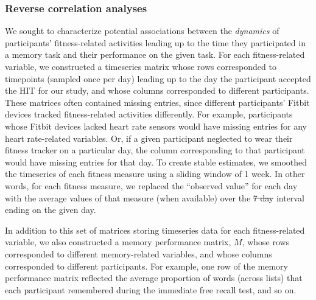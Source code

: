 \documentclass[10pt]{article}
\providecommand{\DIFaddtex}[1]{{\protect\color{blue}\uwave{#1}}} %
\providecommand{\DIFdeltex}[1]{{\protect\color{red}\sout{#1}}}                      %
\providecommand{\DIFaddbegin}{} %
\providecommand{\DIFaddend}{} %
\providecommand{\DIFdelbegin}{} %
\providecommand{\DIFdelend}{} %
\providecommand{\DIFadd}[1]{\texorpdfstring{\DIFaddtex{#1}}{#1}} %
\providecommand{\DIFdel}[1]{\texorpdfstring{\DIFdeltex{#1}}{}} %
\newcommand{\DIFscaledelfig}{0.5}
\newlength{\DIFdelgraphicswidth} %
\newlength{\DIFdelgraphicsheight} %
\newcommand{\DIFaddincludegraphics}[2][]{{\color{blue}\fbox{\DIFOincludegraphics[#1]{#2}}}} %
\newcommand{\DIFdelincludegraphics}[2][]{%
\sbox{\DIFdelgraphicsbox}{\DIFOincludegraphics[#1]{#2}}%
\settoboxwidth{\DIFdelgraphicswidth}{\DIFdelgraphicsbox} %
\settoboxtotalheight{\DIFdelgraphicsheight}{\DIFdelgraphicsbox} %
\scalebox{\DIFscaledelfig}{%
\parbox[b]{\DIFdelgraphicswidth}{\usebox{\DIFdelgraphicsbox}\\[-\baselineskip] \rule{\DIFdelgraphicswidth}{0em}}\llap{\resizebox{\DIFdelgraphicswidth}{\DIFdelgraphicsheight}{%
\setlength{\unitlength}{\DIFdelgraphicswidth}%
\begin{picture}(1,1)%
\thicklines\linethickness{2pt} %
{\color[rgb]{1,0,0}\put(0,0){\framebox(1,1){}}}%
{\color[rgb]{1,0,0}\put(0,0){\line( 1,1){1}}}%
{\color[rgb]{1,0,0}\put(0,1){\line(1,-1){1}}}%
\end{picture}%
}\hspace*{3pt}}} %
} %
\DeclareRobustCommand{\DIFaddbegin}{\DIFOaddbegin \let\includegraphics\DIFaddincludegraphics} %
\DeclareRobustCommand{\DIFaddend}{\DIFOaddend \let\includegraphics\DIFOincludegraphics} %
\DeclareRobustCommand{\DIFdelbegin}{\DIFOdelbegin \let\includegraphics\DIFdelincludegraphics} %
\DeclareRobustCommand{\DIFdelend}{\DIFOaddend \let\includegraphics\DIFOincludegraphics} %
\begin{document}
\subsubsection*{Reverse correlation analyses}
We sought to characterize potential associations between the \textit{dynamics}
of participants' fitness-related activities leading up to the time
they participated in a memory task and their performance on the given
task.  For each fitness-related variable, we constructed a timeseries
matrix whose rows corresponded to timepoints (sampled once per day)
leading up to the day the participant accepted the HIT for our study,
and whose columns corresponded to different participants.  These
matrices often contained missing entries, since different
participants' Fitbit devices tracked fitness-related activities
differently.  For example, participants whose Fitbit devices lacked
heart rate sensors would have missing entries for any heart
rate-related variables.  Or, if a given participant neglected to wear
their fitness tracker on a particular day, the column corresponding to
that participant would have missing entries for that day.  To create
stable estimates, we smoothed the timeseries of each fitness measure
using a sliding window of 1 week.  In other words, for each fitness
measure, we replaced the ``observed
value'' for each day with the average values of that measure (when
available) over the \DIFdelbegin \DIFdel{7 day }\DIFdelend \DIFaddbegin \DIFadd{7-day }\DIFaddend interval ending on the given day.

In addition to this set of matrices storing timeseries data for each
fitness-related variable, we also constructed a memory performance
matrix, $M$, whose rows corresponded to different memory-related
variables, and whose columns corresponded to different participants.
For example, one row of the memory performance matrix reflected the
average proportion of words (across lists) that each participant
remembered during the immediate free recall test, and so on.
\end{document}
